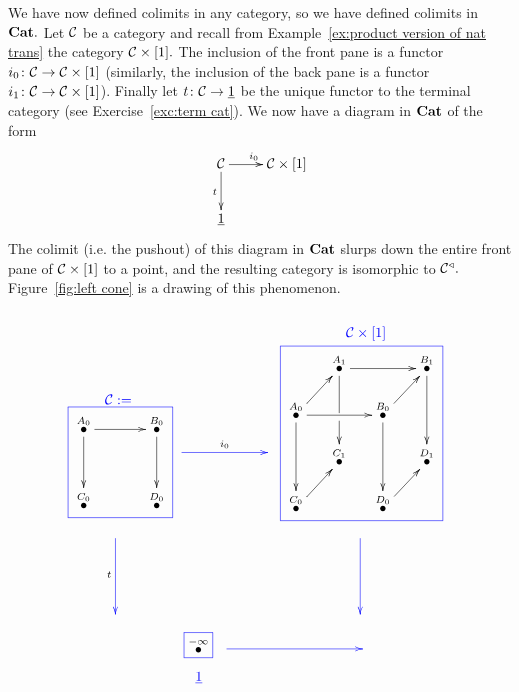 \documentclass[../main/CT4S-EN-RU]{subfiles}
\begin{document}
\begin{exampleENG}
We have now defined colimits in any category, so we have defined colimits in ${\mathbf{Cat}}.$ Let $\mathcal{C}$ be a category and recall from Example~\ref{ex:product version of nat trans} the category $\mathcal{C}\times[1].$ The inclusion of the front pane is a functor $i_0\colon\mathcal{C}\rightarrow\mathcal{C}\times[1]$ (similarly, the inclusion of the back pane is a functor $i_1\colon\mathcal{C}\rightarrow\mathcal{C}\times[1]$). Finally let $t\colon\mathcal{C}\rightarrow\underline{1}$ be the unique functor to the terminal category (see Exercise~\ref{exc:term cat}). We now have a diagram in ${\mathbf{Cat}}$ of the form 
$$\xymatrix{\mcC\ar[r]^{i_0}\ar[d]_{t}&\mcC\times[1]\\\ul{1}}$$
The colimit (i.e. the pushout) of this diagram in ${\mathbf{Cat}}$ slurps down the entire front pane of $\mathcal{C}\times[1]$ to a point, and the resulting category is isomorphic to $\mathcal{C}^\triangleleft.$ Figure~\ref{fig:left cone} is a drawing of this phenomenon.
\begin{figure}[H]
$$
\parbox{1in}{~\vspace{.6in}\boxtitle{\color{blue}{$\mcC:=$}}\cfbox{blue}{\parbox{.7in}{\xymatrix@=15pt{
\LMO{A_0}\ar[rr]\ar[dd]&&\LMO{B_0}\ar[dd]\\\\\LMO{C_0}&&\LMO{D_0}
}}}}
\parbox{1.1in}{~\vspace{.6in}\\\xymatrix{~\ar@[blue][rr]^{i_0}&\hspace{.1in}&~}}
\parbox{1.7in}{\boxtitle{\color{blue}{$\mcC\times[1]$}}\cfbox{blue}{\parbox{1.4in}{\xymatrix@=15pt{
&\LMO{A_1}\ar[rr]\ar'[d][dd]&&\LMO{B_1}\ar[dd]\\
\LMO{A_0}\ar[ur]\ar[rr]\ar[dd]&&\LMO{B_0}\ar[ur]\ar[dd]\\
&\LMO{C_1}&&\LMO{D_1}\\
\LMO{C_0}\ar[ur]&&\LMO{D_0}\ar[ur]&
}}}}
$$
$$
\hspace{-.5in}\xymatrix{~\ar@[blue][dd]_t\\\\~}\hspace{2.3in}\xymatrix{~\ar@[blue][dd]\\\\~}
$$
$$
\hspace{.4in}\parbox{.3in}{\cfbox{blue}{$\LMO{-\infty}$}\begin{center}\color{blue}{$\ul{1}$}\end{center}}
\parbox{1.6in}{\xymatrix{~\ar@[blue][rr]&\hspace{.6in}&~}\vspace{.15in}~}
$$
\end{figure}
\end{exampleENG}
\end{document}
